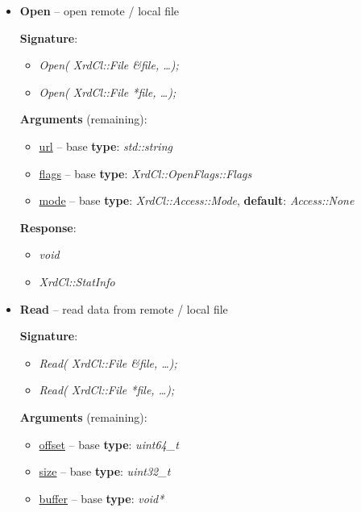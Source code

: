 \documentclass{article}
\begin{document}
			\begin{itemize}
	
				\item \textbf{Open} -- open remote / local file
		
			        \textbf{Signature}:
			        \begin{itemize}
			          \item \textit{Open( XrdCl::File \&file, \ldots);}
			          \item \textit{Open( XrdCl::File *file, \ldots );}
			        \end{itemize}
					
					\textbf{Arguments} (remaining):
					\begin{itemize}
					  \item \underline{url} -- base \textbf{type}: \textit{std::string}
					  \item \underline{flags} -- base \textbf{type}: \textit{XrdCl::OpenFlags::Flags}
					  \item \underline{mode} -- base \textbf{type}: \textit{XrdCl::Access::Mode}, \textbf{default}: \textit{Access::None}
				    \end{itemize}
						
					\textbf{Response}:
					\begin{itemize}
					  \item \textit{void}
					  \item \textit{XrdCl::StatInfo}
					\end{itemize}
					  
				  \item \textbf{Read} -- read data from remote / local file
				  
				  	\textbf{Signature}:
				  	\begin{itemize} 
			          \item \textit{Read( XrdCl::File \&file, \ldots);}
			          \item \textit{Read( XrdCl::File *file, \ldots );}
			        \end{itemize}
			        
			        \textbf{Arguments} (remaining):
					\begin{itemize}
					  \item \underline{offset} -- base \textbf{type}: \textit{uint64_t}
					  \item \underline{size} -- base \textbf{type}: \textit{uint32_t}
					  \item \underline{buffer} -- base \textbf{type}: \textit{void*}
				    \end{itemize}
				    

\end{itemize}
\end{document}
